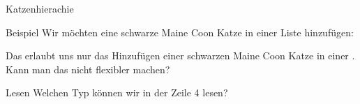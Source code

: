 \documentclass{../tuda-beamer}
\begin{document}
    \begin{frame}[c]{Katzenhierachie}
        
    \end{frame}

    \begin{frame}[c]{Beispiel}
        Wir möchten eine schwarze Maine Coon Katze in einer Liste hinzufügen:

        

        \pause

        Das erlaubt uns nur das Hinzufügen einer schwarzen Maine Coon Katze in einer
        .
        Kann man das nicht flexibler machen?
    \end{frame}

    \begin{frame}[c]
        
    \end{frame}

    \begin{frame}[c]
        
    \end{frame}

    \begin{frame}{Lesen}
        Welchen Typ können wir in der Zeile 4 lesen?

        
    \end{frame}
\end{document}
